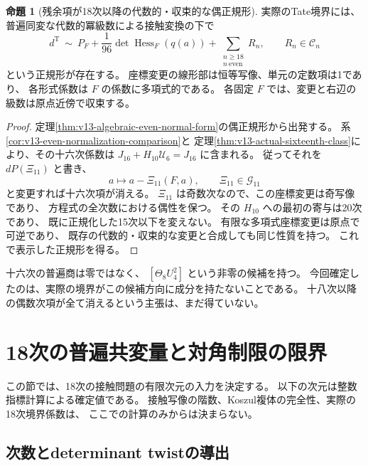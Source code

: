 \documentclass[a4paper,11pt]{ltjsarticle}
\theoremstyle{definition}
\newtheorem{theorem}{命題}[section]
\begin{document}
\begin{theorem}[残余項が18次以降の代数的・収束的な偶正規形]
\label{thm:v13-eighteenth-even-normal-form}
実際のTate境界には、普遍同変な代数的冪級数による接触変換の下で
\begin{equation}\label{eq:v13-eighteenth-even-normal-form}
 \boxed{\displaystyle
 d^{\mathrm T}\ \sim\
 P_F+\frac1{96}\det\operatorname{Hess}_F(q(a))
       +\sum_{\substack{n\ge18\\n\ \mathrm{even}}}R_n,
 \qquad R_n\in\mathcal C_n
 }
\end{equation}
という正規形が存在する。
座標変更の線形部は恒等写像、単元の定数項は1であり、
各形式係数は $F$ の係数に多項式的である。
各固定 $F$ では、変更と右辺の級数は原点近傍で収束する。
\end{theorem}
\begin{proof}
定理\ref{thm:v13-algebraic-even-normal-form}の偶正規形から出発する。
系\ref{cor:v13-even-normalization-comparison}と
定理\ref{thm:v13-actual-sixteenth-class}により、その十六次係数は
$J_{16}+H_{10}\mathcal U_6=J_{16}$ に含まれる。
従ってそれを $dP(\Xi_{11})$ と書き、
\[
 a\longmapsto a-\Xi_{11}(F,a),\qquad \Xi_{11}\in\mathcal G_{11}
\]
と変更すれば十六次項が消える。
$\Xi_{11}$ は奇数次なので、この座標変更は奇写像であり、
方程式の全次数における偶性を保つ。
その $H_{10}$ への最初の寄与は20次であり、
既に正規化した15次以下を変えない。
有限な多項式座標変更は原点で可逆であり、
既存の代数的・収束的な変更と合成しても同じ性質を持つ。
これで表示した正規形を得る。
\end{proof}

十六次の普遍商は零ではなく、
$[\Theta_8U_4^2]$ という非零の候補を持つ。
今回確定したのは、実際の境界がこの候補方向に成分を持たないことである。
十八次以降の偶数次項が全て消えるという主張は、まだ得ていない。


\clearpage
\section{18次の普遍共変量と対角制限の限界}
\label{sec:v14-eighteenth-characters}

この節では、18次の接触問題の有限次元の入力を決定する。
以下の次元は整数指標計算による確定値である。
接触写像の階数、Koszul複体の完全性、実際の18次境界係数は、
ここでの計算のみからは決まらない。

\subsection{次数とdeterminant twistの導出}
\end{document}
